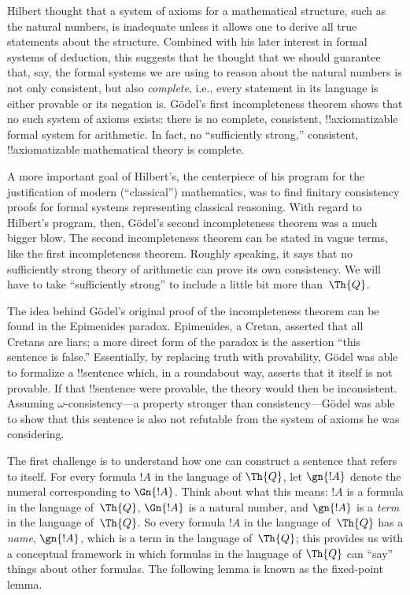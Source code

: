 \documentclass[../../../include/open-logic-section]{subfiles}
\begin{document}


Hilbert thought that a system of axioms for a mathematical structure,
such as the natural numbers, is inadequate unless it allows one to
derive all true statements about the structure. Combined with his
later interest in formal systems of deduction, this suggests that he
thought that we should guarantee that, say, the formal systems we are
using to reason about the natural numbers is not only consistent, but
also \emph{complete}, i.e., every statement in its language is either
provable or its negation is. G\"odel's first incompleteness theorem
shows that no such system of axioms exists: there is no complete,
consistent, !!{axiomatizable} formal system for arithmetic.  In fact,
no ``sufficiently strong,'' consistent, !!{axiomatizable} mathematical
theory is complete.

A more important goal of Hilbert's, the centerpiece of his program for
the justification of modern (``classical'') mathematics, was to find
finitary consistency proofs for formal systems representing classical
reasoning.  With regard to Hilbert's program, then, G\"odel's second
incompleteness theorem was a much bigger blow. The second
incompleteness theorem can be stated in vague terms, like the first
incompleteness theorem. Roughly speaking, it says that no sufficiently
strong theory of arithmetic can prove its own consistency. We will
have to take ``sufficiently strong'' to include a little bit more
than~$\Th{Q}$.

The idea behind G\"odel's original proof of the incompleteness theorem
can be found in the Epimenides paradox. Epimenides, a Cretan, asserted
that all Cretans are liars; a more direct form of the paradox is the
assertion ``this sentence is false.'' Essentially, by replacing truth
with provability, G\"odel was able to formalize a !!{sentence} which,
in a roundabout way, asserts that it itself is not provable.  If that
!!{sentence} were provable, the theory would then be
inconsistent. Assuming $\omega$-consistency---a property stronger than
consistency---G\"odel was able to show that this sentence is also not
refutable from the system of axioms he was considering.

The first challenge is to understand how one can construct a sentence
that refers to itself. For every formula $!A$ in the language of $\Th{Q}$,
let $\gn{!A}$ denote the numeral corresponding to $\Gn{!A}$. Think
about what this means: $!A$ is a formula in the language of~$\Th{Q}$,
$\Gn{!A}$ is a natural number, and $\gn{!A}$ is a \emph{term} in the
language of~$\Th{Q}$. So every formula $!A$ in the language of~$\Th{Q}$ has a
\emph{name}, $\gn{!A}$, which is a term in the language of~$\Th{Q}$; this
provides us with a conceptual framework in which formulas in the
language of $\Th{Q}$ can ``say'' things about other formulas. The following
lemma is known as the fixed-point lemma.
\end{document}
